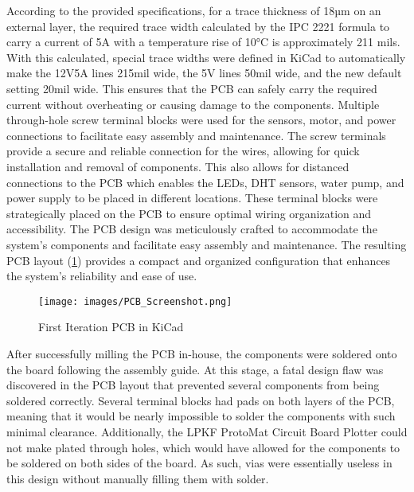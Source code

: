 \documentclass[12pt]{article} %
\begin{document}
\noindent According to the provided specifications, for a trace thickness of 18µm on an external layer, the required trace width calculated by the IPC 2221 formula to carry a current of 5A with a temperature rise of 10°C is approximately 211 mils. With this calculated, special trace widths were defined in KiCad to automatically make the 12V5A lines 215mil wide, the 5V lines 50mil wide, and the new default setting 20mil wide. This ensures that the PCB can safely carry the required current without overheating or causing damage to the components.
\newline
\newline
\noindent Multiple through-hole screw terminal blocks were used for the sensors, motor, and power connections to facilitate easy assembly and maintenance. The screw terminals provide a secure and reliable connection for the wires, allowing for quick installation and removal of components. This also allows for distanced connections to the PCB which enables the LEDs, DHT sensors, water pump, and power supply to be placed in different locations. These terminal blocks were strategically placed on the PCB to ensure optimal wiring organization and accessibility. The PCB design was meticulously crafted to accommodate the system's components and facilitate easy assembly and maintenance. The resulting PCB layout (\ref{fig:PCB_DESIGN}) provides a compact and organized configuration that enhances the system's reliability and ease of use.
\begin{figure}[H]
    \centering
    \texttt{[image: images/PCB\_Screenshot.png]}
    \caption{First Iteration PCB in KiCad}
    \label{fig:PCB_DESIGN}
\end{figure}
\noindent After successfully milling the PCB in-house, the components were soldered onto the board following the assembly guide. At this stage, a fatal design flaw was discovered in the PCB layout that prevented several components from being soldered correctly. Several terminal blocks had pads on both layers of the PCB, meaning that it would be nearly impossible to solder the components with such minimal clearance. Additionally, the LPKF ProtoMat Circuit Board Plotter could not make plated through holes, which would have allowed for the components to be soldered on both sides of the board. As such, vias were essentially useless in this design without manually filling them with solder.
\newline
\newline
\end{document}
